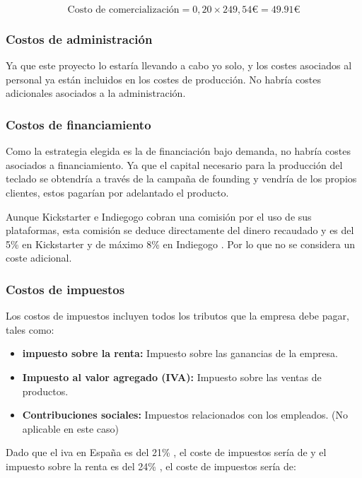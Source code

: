 \begin{equation}
\text{Costo de comercialización} = 0,20 \times 249,54 \euro = 49.91 \euro
\end{equation}

\subsubsection{Costos de administración}
Ya que este proyecto lo estaría llevando a cabo yo solo, y los costes asociados al personal ya están incluidos en los costes de producción. No habría costes adicionales asociados a la administración.

\subsubsection{Costos de financiamiento}
Como la estrategia elegida es la de financiación bajo demanda, no habría costes asociados a financiamiento. Ya que el capital necesario para la producción del teclado se obtendría a través de la campaña de founding y vendría de los propios clientes, estos pagarían por adelantado el producto.

Aunque Kickstarter e Indiegogo cobran una comisión por el uso de sus plataformas, esta comisión se deduce directamente del dinero recaudado y es del 5\% en Kickstarter \cite{ComisionKickStarer} y de máximo 8\% en Indiegogo \cite{ComisionIndiegogo}. Por lo que no se considera un coste adicional.
\subsubsection{Costos de impuestos}

Los costos de impuestos incluyen todos los tributos que la empresa debe pagar, tales como:

\begin{itemize}
\item \textbf{impuesto sobre la renta:} Impuesto sobre las ganancias de la empresa.
\item \textbf{Impuesto al valor agregado (IVA):} Impuesto sobre las ventas de productos.
\item \textbf{Contribuciones sociales:} Impuestos relacionados con los empleados. (No aplicable en este caso)
\end{itemize}

Dado que el iva en España es del 21\% \cite{IVA}, el coste de impuestos sería de y el impuesto sobre la renta es del 24\% \cite{ImpuestoRenta}, el coste de impuestos sería de:

